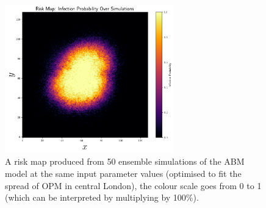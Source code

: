 \documentclass[12pt]{article}
\begin{document}
\begin{figure}[h]
    \centering
    \includegraphics[width=0.65\textwidth]{risk_map.png}
    \caption{A risk map produced from 50 ensemble simulations of the ABM model at the same input parameter values (optimised to fit the spread of OPM in central London), the colour scale goes from 0 to 1 (which can be interpreted by multiplying by 100\%).
    \label{fig:risk_map}}
\end{figure}
\end{document}
